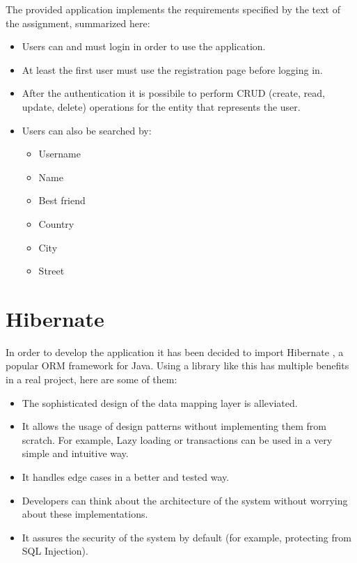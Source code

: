 \documentclass[a4paper]{report}
\begin{document}
	The provided application implements the requirements specified by the text of the assignment, summarized here:
	
	\begin{itemize}
		\item Users can and must login in order to use the application.
		\item At least the first user must use the registration page before logging in.
		\item After the authentication it is possibile to perform CRUD (create, read, update, delete) operations for the entity that represents the user.
		\item Users can also be searched by:
			\begin{itemize}
				\item Username
				\item Name
				\item Best friend
				\item Country
				\item City
				\item Street
		\end{itemize}
	\end{itemize}

	\section{Hibernate}
	\label{sec:hibernate}
	
	In order to develop the application it has been decided to import Hibernate \cite{site:hibernate}, a popular ORM framework for Java. Using a library like this has multiple benefits in a real project, here are some of them:
	
	\begin{itemize}
		\item The sophisticated design of the data mapping layer is alleviated.
		\item It allows the usage of design patterns without implementing them from scratch. For example, Lazy loading or transactions can be used in a very simple and intuitive way.
		\item It handles edge cases in a better and tested way.
		\item Developers can think about the architecture of the system without worrying about these implementations.
		\item It assures the security of the system by default (for example, protecting from SQL Injection).
	\end{itemize}
	
\end{document}
